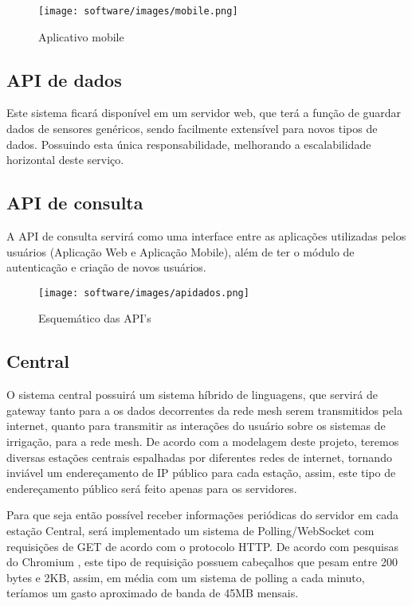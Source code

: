     \begin{figure}[H]
    	
    	\centering
        \texttt{[image: software/images/mobile.png]}
        \caption{Aplicativo mobile}
        \label{fig:mobile}
    \end{figure}

    \subsection{API de dados}

    Este sistema ficará disponível em um servidor web, que terá a função de guardar dados de sensores genéricos, sendo facilmente extensível para novos tipos de dados. Possuindo esta única responsabilidade, melhorando a escalabilidade horizontal deste serviço.

    \subsection{API de consulta}

    A API de consulta servirá como uma interface entre as aplicações utilizadas pelos usuários (Aplicação Web e Aplicação Mobile), além de ter o módulo de autenticação e criação de novos usuários.

    \begin{figure}[H]
    	\centering
        \texttt{[image: software/images/apidados.png]}
        \caption{Esquemático das API's}
        \label{fig:apidados}
    \end{figure}

    \subsection{Central}

    O sistema central possuirá um sistema híbrido de linguagens, que servirá de gateway  tanto para a os dados decorrentes da rede mesh serem transmitidos pela internet, quanto para transmitir as interações do usuário sobre os sistemas de irrigação, para a rede mesh. 
	De acordo com a modelagem deste projeto, teremos diversas estações centrais espalhadas por diferentes redes de internet, tornando inviável um endereçamento de IP público para cada estação, assim, este tipo de endereçamento público será feito apenas para os servidores.
    
    Para que seja então possível receber informações periódicas do servidor em cada estação Central, será implementado um sistema de Polling/WebSocket com requisições de GET de acordo com o protocolo HTTP. De acordo com pesquisas do Chromium \cite{chromium}, este tipo de requisição possuem cabeçalhos que pesam entre 200 bytes e 2KB, assim, em média com um sistema de polling a cada minuto, teríamos um gasto aproximado de banda de 45MB mensais.
    
